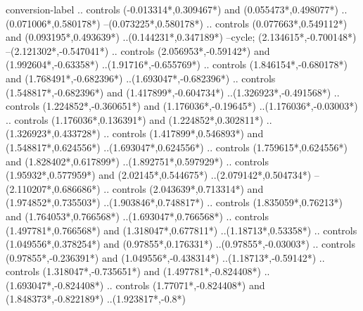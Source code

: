 {\begin{scope}[x=1mm,y=1mm,line width=\SCstroke mm,line cap=round,line join=round]
\begin{SCpart}{conversion-label}
.. controls ({-0.013314*\SCscale},{0.309467*\SCscale}) and ({0.055473*\SCscale},{0.498077*\SCscale}) ..({0.071006*\SCscale},{0.580178*\SCscale})
--({0.073225*\SCscale},{0.580178*\SCscale})
.. controls ({0.077663*\SCscale},{0.549112*\SCscale}) and ({0.093195*\SCscale},{0.493639*\SCscale}) ..({0.144231*\SCscale},{0.347189*\SCscale})
--cycle;
 ({2.134615*\SCscale},{-0.700148*\SCscale})
--({2.121302*\SCscale},{-0.547041*\SCscale})
.. controls ({2.056953*\SCscale},{-0.59142*\SCscale}) and ({1.992604*\SCscale},{-0.63358*\SCscale}) ..({1.91716*\SCscale},{-0.655769*\SCscale})
.. controls ({1.846154*\SCscale},{-0.680178*\SCscale}) and ({1.768491*\SCscale},{-0.682396*\SCscale}) ..({1.693047*\SCscale},{-0.682396*\SCscale})
.. controls ({1.548817*\SCscale},{-0.682396*\SCscale}) and ({1.417899*\SCscale},{-0.604734*\SCscale}) ..({1.326923*\SCscale},{-0.491568*\SCscale})
.. controls ({1.224852*\SCscale},{-0.360651*\SCscale}) and ({1.176036*\SCscale},{-0.19645*\SCscale}) ..({1.176036*\SCscale},{-0.03003*\SCscale})
.. controls ({1.176036*\SCscale},{0.136391*\SCscale}) and ({1.224852*\SCscale},{0.302811*\SCscale}) ..({1.326923*\SCscale},{0.433728*\SCscale})
.. controls ({1.417899*\SCscale},{0.546893*\SCscale}) and ({1.548817*\SCscale},{0.624556*\SCscale}) ..({1.693047*\SCscale},{0.624556*\SCscale})
.. controls ({1.759615*\SCscale},{0.624556*\SCscale}) and ({1.828402*\SCscale},{0.617899*\SCscale}) ..({1.892751*\SCscale},{0.597929*\SCscale})
.. controls ({1.95932*\SCscale},{0.577959*\SCscale}) and ({2.02145*\SCscale},{0.544675*\SCscale}) ..({2.079142*\SCscale},{0.504734*\SCscale})
--({2.110207*\SCscale},{0.686686*\SCscale})
.. controls ({2.043639*\SCscale},{0.713314*\SCscale}) and ({1.974852*\SCscale},{0.735503*\SCscale}) ..({1.903846*\SCscale},{0.748817*\SCscale})
.. controls ({1.835059*\SCscale},{0.76213*\SCscale}) and ({1.764053*\SCscale},{0.766568*\SCscale}) ..({1.693047*\SCscale},{0.766568*\SCscale})
.. controls ({1.497781*\SCscale},{0.766568*\SCscale}) and ({1.318047*\SCscale},{0.677811*\SCscale}) ..({1.18713*\SCscale},{0.53358*\SCscale})
.. controls ({1.049556*\SCscale},{0.378254*\SCscale}) and ({0.97855*\SCscale},{0.176331*\SCscale}) ..({0.97855*\SCscale},{-0.03003*\SCscale})
.. controls ({0.97855*\SCscale},{-0.236391*\SCscale}) and ({1.049556*\SCscale},{-0.438314*\SCscale}) ..({1.18713*\SCscale},{-0.59142*\SCscale})
.. controls ({1.318047*\SCscale},{-0.735651*\SCscale}) and ({1.497781*\SCscale},{-0.824408*\SCscale}) ..({1.693047*\SCscale},{-0.824408*\SCscale})
.. controls ({1.77071*\SCscale},{-0.824408*\SCscale}) and ({1.848373*\SCscale},{-0.822189*\SCscale}) ..({1.923817*\SCscale},{-0.8*\SCscale})

\end{SCpart}
\end{scope}}
